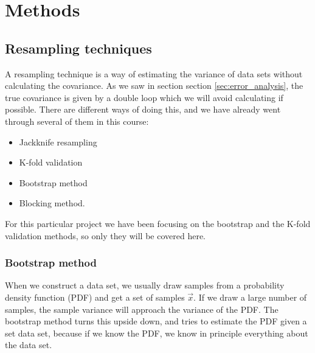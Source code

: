 \section{Methods} \label{sec:methods}

\subsection{Resampling techniques} \label{sec:resampling}
A resampling technique is a way of estimating the variance of data sets without calculating the covariance. As we saw in section section \ref{sec:error_analysis}, the true covariance is given by a double loop which we will avoid calculating if possible. There are different ways of doing this, and we have already went through several of them in this course:
\begin{itemize}
\item{Jackknife resampling}
\item{K-fold validation}
\item{Bootstrap method}
\item{Blocking method}.
\end{itemize}

For this particular project we have been focusing on the bootstrap and the K-fold validation methods, so only they will be covered here.

\subsubsection{Bootstrap method} \label{sec:bootstrap}
When we construct a data set, we usually draw samples from a probability density function (PDF) and get a set of samples $\vec{x}$. If we draw a large number of samples, the sample variance will approach the variance of the PDF. The bootstrap method turns this upside down, and tries to estimate the PDF given a set data set, because if we know the PDF, we know in principle everything about the data set. 

